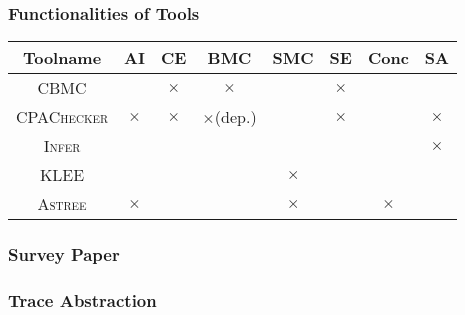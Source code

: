\documentclass[11pt]{beamer}
\begin{document}
\begin{frame}\frametitle{Functionalities of Tools}
\begin{tabular}{c|c|c|c|c|c|c|c}
Toolname & AI & CE & BMC & SMC & SE & Conc & SA\\
\hline 
\textsc{CBMC} & & $\times$ & $\times$ & &$\times$& &\\
\textsc{CPAChecker} & $\times$ & $\times$ & $\times$(dep.) & & $\times$ & & $\times$\\
\textsc{Infer} & & & & & & &$\times$\\
\textsc{KLEE} & & & & $\times$ & &\\
\textsc{Astree} &$\times$& & & $\times$ & &$\times$\\ 


\end{tabular}
\end{frame}

\begin{frame}\frametitle{Survey Paper}

\end{frame}

\begin{frame}\frametitle{Trace Abstraction}

\end{frame}
\end{document}
